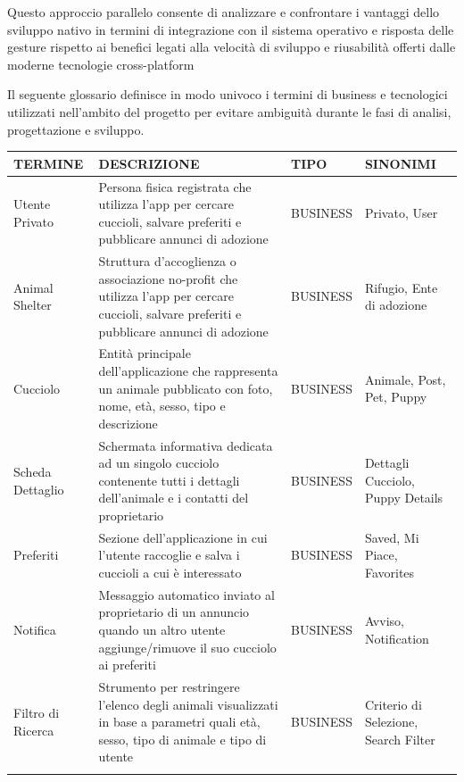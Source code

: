 \documentclass[a4paper]{report}
\begin{document}
\noindent Questo approccio parallelo consente di analizzare e confrontare i vantaggi dello sviluppo nativo in termini di integrazione con il sistema operativo e risposta delle gesture rispetto ai benefici legati alla velocità di sviluppo e riusabilità offerti dalle moderne tecnologie cross-platform




Il seguente glossario definisce in modo univoco i termini di business e tecnologici utilizzati nell’ambito del progetto per evitare ambiguità durante le fasi di analisi, progettazione e sviluppo.


\vspace{0.5cm} %


\begin{longtable}{ >{\raggedright\arraybackslash}p{1.5cm} >{\raggedright\arraybackslash}p{5.5cm} >{\raggedright\arraybackslash}p{2cm} >{\raggedright\arraybackslash}p{2.97cm}}
\toprule
\textbf{TERMINE} & \textbf{DESCRIZIONE} & \textbf{TIPO} & \textbf{SINONIMI} \\
\midrule
\endhead
\bottomrule
\endfoot
\endlastfoot
Utente Privato & Persona fisica registrata che utilizza l'app per cercare cuccioli, salvare preferiti e pubblicare annunci di adozione & BUSINESS & Privato, User \\ \addlinespace
Animal Shelter & Struttura d'accoglienza o associazione no-profit che utilizza l’app per cercare cuccioli, salvare preferiti e pubblicare annunci di adozione & BUSINESS & Rifugio, Ente di adozione \\ \addlinespace
Cucciolo & Entità principale dell'applicazione che rappresenta un animale pubblicato con foto, nome, età, sesso, tipo e descrizione & BUSINESS & Animale, Post, Pet, Puppy \\ \addlinespace
Scheda Dettaglio & Schermata informativa dedicata ad un singolo cucciolo contenente tutti i dettagli dell'animale e i contatti del proprietario & BUSINESS & Dettagli Cucciolo, Puppy Details \\ \addlinespace
Preferiti & Sezione dell'applicazione in cui l'utente raccoglie e salva i cuccioli a cui è interessato & BUSINESS & Saved, Mi Piace, Favorites \\ \addlinespace
Notifica & Messaggio automatico inviato al proprietario di un annuncio quando un altro utente aggiunge/rimuove il suo cucciolo ai preferiti & BUSINESS & Avviso, Notification \\ \addlinespace
Filtro di Ricerca & Strumento per restringere l'elenco degli animali visualizzati in base a parametri quali età, sesso, tipo di animale e tipo di utente & BUSINESS & Criterio di Selezione, Search Filter \\ \addlinespace

\end{longtable}
\end{document}
